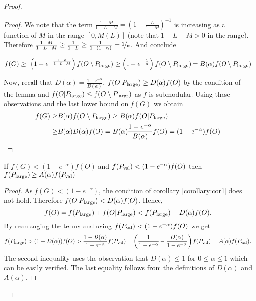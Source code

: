 \documentclass[a4paper,UKenglish,cleveref, autoref]{lipics-v2019}
\begin{document}
\begin{proof}
\begin{proof}
  	We note that the term $\frac{1-M}{1-L-M} = \left(  1- \frac{L}{1-M} \right)^{-1}$ is increasing as a function
  	of $M$  in the range $[0, M(L)]$ (note that $1-L-M >0$ in the range).
  	Therefore $\frac{1-M}{1-L-M} \geq  \frac{1 }{1-L}  \geq \frac{1}{1-(1-\alpha)} = \nicefrac[]{1}{\alpha}$. And conclude
  		
  	  $$f(G)
  	\geq \ \left(1-e^{- \frac{1-M }{1-L-M}}\right) f(O\setminus P_{\text{large}}) \geq \left( 1- e ^ {- \frac{1}{ \alpha}} \right)f(O\setminus P_{\text{large}})
  	= B(\alpha)f(O\setminus P_{\text{large}}) $$
  	
  	Now, recall that $D(\alpha)= \frac{1-e^{-\alpha}}{B(\alpha)}$,
	$f(O|P_{\text{large}}) \geq D(\alpha) f(O)$ by the condition of the
	lemma and $f(O|P_{\text{large}}) \leq f(O\setminus P_{\text{large}})$ as
	$f$ is submodular. Using these observations and the last lower
	bound on $f(G)$ we obtain
\begin{align*}
f(G) \geq& B(\alpha)f(O\setminus P_{\text{large}})  \geq
B(\alpha) f(O|P_{\text{large}})\\  \geq&
B(\alpha ) D(\alpha ) f(O)
= B(\alpha)\frac{1-e^{-\alpha}}{B(\alpha) }f(O)= (1-e^{-\alpha})f(O)
\end{align*}

	\end{proof}

	\begin{corollary}
		\label{corollary:cor2}
		If $f(G)< (1-e^{-\alpha})f(O)$ and $f(P_{\text{val}}) < (1-e^{-\alpha})f(O)$ then
		$f(P_{\text{large}}) \geq A(\alpha) f(P_{\text{val}})$
		\end{corollary}
	\begin{proof}
		As $f(G)< (1-e^{-\alpha})$, the condition of corollary \ref{corollary:cor1} does not hold. Therefore
		$f(O|P_{\text{large}})< D(\alpha) f(O)$. Hence,
		$$f(O)= f(P_{\text{large}}) + f(O|P_{\text{large}}) < f(P_{\text{large}}) + D(\alpha) f(O).$$
		By rearranging the terms and using $f(P_{\text{val}}) < (1-e^{-\alpha})f(O)$
		we get
		$$
		f(P_{\text{large}}) > (1-D(\alpha)) f(O) > \frac{1-D(\alpha)}{1-e^{-\alpha}} f(P_{\text{val}})
		= \left(\frac{1}{1-e^{-\alpha}} - \frac{D(\alpha)}{1-e^{-\alpha}}\right) f(P_{\text{val}}) = A(\alpha) f(P_{\text{val}}).
		$$
		The second inequality uses the observation that $D(\alpha) \leq 1$ for $0\leq \alpha \leq 1$ which can be easily verified. The last equality follows from the definitions
		of $D(\alpha)$ and $A(\alpha)$.
		

\end{proof}
\end{proof}
\end{document}
